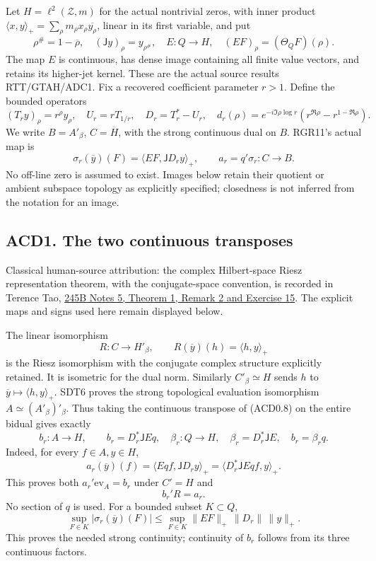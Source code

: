 Let \(H=\ell^2(\mathscr Z,m)\) for the actual nontrivial zeros, with
inner product
\(\langle x,y\rangle_+=\sum_\rho m_\rho x_\rho\overline{y_\rho}\),
linear in its first variable, and put \[
\rho^\#=1-\overline\rho,\quad (\mathsf Jy)_\rho=y_{\rho^\#},\quad
E:Q\to H,\quad (EF)_\rho=(\Theta_QF)(\rho).
\tag{ACD0.6}
\] The map \(E\) is continuous, has dense image containing all finite
value vectors, and retains its higher-jet kernel. These are the actual
source results RTT/GTAH/ADC1. Fix a recovered coefficient parameter
\(r>1\). Define the bounded operators \[
(T_ry)_\rho=r^\rho y_\rho,\quad U_r=rT_{1/r},\quad
D_r=T_r^*-U_r,\quad
d_r(\rho)=e^{-i\Im\rho\log r}(r^{\Re\rho}-r^{1-\Re\rho}).
\tag{ACD0.7}
\] We write \(B=A'_\beta\), \(C=\overline H\), with the strong
continuous dual on \(B\). RGR11's actual map is \[
\sigma_r(\overline y)(F)=\langle EF,\mathsf JD_ry\rangle_+,
\qquad a_r=q'\sigma_r:C\to B.
\tag{ACD0.8}
\] No off-line zero is assumed to exist. Images below retain their
quotient or ambient subspace topology as explicitly specified;
closedness is not inferred from the notation for an image.

\subsection{ACD1. The two continuous
transposes}\label{acd1.-the-two-continuous-transposes}

Classical human-source attribution: the complex Hilbert-space Riesz representation theorem, with the conjugate-space convention, is recorded in Terence Tao, \href{https://terrytao.wordpress.com/2009/01/17/254a-notes-5-hilbert-spaces/}{245B Notes 5, Theorem 1, Remark 2 and Exercise 15}. The explicit maps and signs used here remain displayed below.

The linear isomorphism \[
R:C\longrightarrow H'_\beta,\qquad
R(\overline y)(h)=\langle h,y\rangle_+
\tag{ACD1.1}
\] is the Riesz isomorphism with the conjugate complex structure
explicitly retained. It is isometric for the dual norm. Similarly
\(C'_\beta\simeq H\) sends \(h\) to
\(\overline y\mapsto\langle h,y\rangle_+\). SDT6 proves the strong
topological evaluation isomorphism \(A\simeq(A'_\beta)'_\beta\). Thus
taking the continuous transpose of (ACD0.8) on the entire bidual gives
exactly \[
b_r:A\to H,\qquad b_r=D_r^*\mathsf JEq,
\quad \beta_r:Q\to H,\quad\beta_r=D_r^*\mathsf JE,
\quad b_r=\beta_rq.
\tag{ACD1.2}
\] Indeed, for every \(f\in A,y\in H\), \[
a_r(\overline y)(f)=\langle Eqf,\mathsf JD_ry\rangle_+
=\langle D_r^*\mathsf JEqf,y\rangle_+.
\tag{ACD1.3}
\] This proves both \(a_r'\mathrm{ev}_A=b_r\) under \(C'=H\) and \[
b_r'R=a_r.
\tag{ACD1.4}
\] No section of \(q\) is used. For a bounded subset \(K\subset Q\), \[
\sup_{F\in K}|\sigma_r(\overline y)(F)|
\leq\sup_{F\in K}\|EF\|_+\,\|D_r\|\,\|y\|_+.
\tag{ACD1.5}
\] This proves the needed strong continuity; continuity of \(b_r\)
follows from its three continuous factors.


